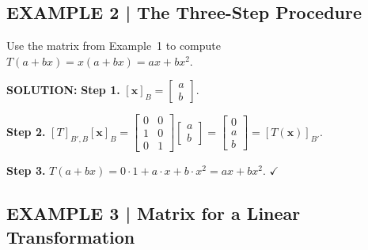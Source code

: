 \documentclass{article}
\begin{document}
\subsection*{EXAMPLE 2 | The Three-Step Procedure}

Use the matrix from Example~1 to compute $T(a+bx) = x(a+bx) = ax+bx^2$.

\textbf{SOLUTION:}
\textbf{Step 1.} $[\mathbf{x}]_B = \begin{bmatrix}a\\b\end{bmatrix}$.

\textbf{Step 2.} $[T]_{B',B}[\mathbf{x}]_B = \begin{bmatrix}0&0\\1&0\\0&1\end{bmatrix}
\begin{bmatrix}a\\b\end{bmatrix} = \begin{bmatrix}0\\a\\b\end{bmatrix} = [T(\mathbf{x})]_{B'}$.

\textbf{Step 3.} $T(a+bx) = 0\cdot 1 + a\cdot x + b\cdot x^2 = ax + bx^2$. $\checkmark$

\subsection*{EXAMPLE 3 | Matrix for a Linear Transformation}
\end{document}
